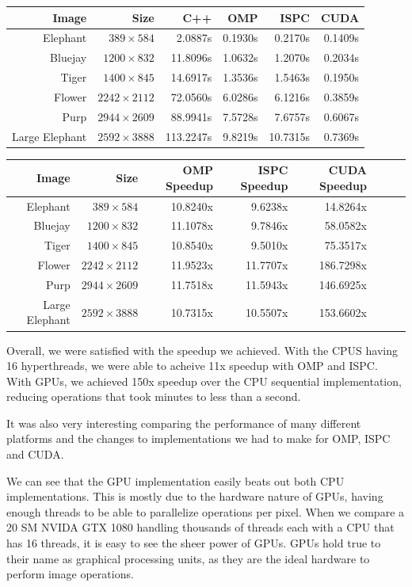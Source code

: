 \documentclass[12pt]{article}
\begin{document}
\begin{tabular}{r|r|r|r|r|r}
    Image & Size & C++ & OMP  & ISPC & CUDA
\\  \hline
    Elephant & $389 \times 584$ & 2.0887s & 0.1930s  & 0.2170s & 0.1409s
\\  Bluejay & $1200 \times 832$ & 11.8096s & 1.0632s  & 1.2070s  & 0.2034s
\\  Tiger & $1400 \times 845$ & 14.6917s & 1.3536s  & 1.5463s  & 0.1950s
\\  Flower & $2242 \times 2112$ & 72.0560s & 6.0286s  & 6.1216s  & 0.3859s
\\  Purp & $2944 \times 2609$ & 88.9941s & 7.5728s  & 7.6757s  & 0.6067s
\\  Large Elephant & $2592 \times 3888$ & 113.2247s  & 9.8219s  & 10.7315s & 0.7369s
\end{tabular}

\begin{tabular}{r|r|r|r|r|r|r|r}
    Image & Size & OMP Speedup & ISPC Speedup & CUDA Speedup
\\  \hline
    Elephant & $389 \times 584$ & 10.8240x & 9.6238x & 14.8264x
\\  Bluejay & $1200 \times 832$ & 11.1078x & 9.7846x & 58.0582x
\\  Tiger & $1400 \times 845$ & 10.8540x & 9.5010x & 75.3517x
\\  Flower & $2242 \times 2112$ & 11.9523x & 11.7707x & 186.7298x
\\  Purp & $2944 \times 2609$ & 11.7518x & 11.5943x & 146.6925x
\\  Large Elephant & $2592 \times 3888$ & 10.7315x & 10.5507x & 153.6602x
\end{tabular}

Overall, we were satisfied with the speedup we achieved. With the CPUS having
16 hyperthreads, we were able to acheive 11x speedup with OMP and ISPC.
With GPUs, we achieved 150x speedup over the CPU sequential implementation,
reducing operations that took minutes to less than a second.

It was also very interesting comparing the performance of many different
platforms and the changes to implementations we had to make for OMP, ISPC and
CUDA.

We can see that the GPU implementation easily beats out both CPU
implementations. This is mostly due to the hardware nature of GPUs, having
enough threads to be able to parallelize operations per pixel. When we compare
a 20 SM NVIDA GTX 1080 handling thousands of threads each with a CPU that has 16
threads, it is easy to see the sheer power of GPUs. GPUs hold true to their
name as graphical processing units, as they are the ideal hardware to perform
image operations.
\end{document}
